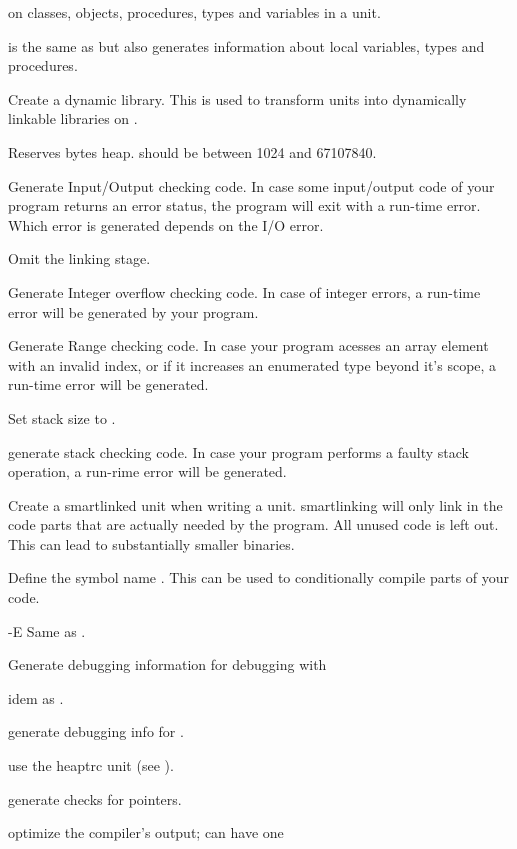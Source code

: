 \documentclass{book}
\begin{document}
\begin{description}
on classes, objects, procedures, types  and variables in a unit.
\item[-bl]  is the same as  but also generates
information about local variables, types and procedures.
\item [-CD] Create a dynamic library. This is used to transform units into
dynamically linkable libraries on \linux.
\item [-Chxxx]  Reserves  bytes heap.  should
be between 1024 and 67107840.
\item [-Ci]  Generate Input/Output checking code. In case some
input/output code of your program returns an error status, the program will
exit with a run-time error. Which error is generated depends on the I/O error.
\item [-Cn]  Omit the linking stage.
\item [-Co]  Generate Integer overflow checking code. In case of
integer errors, a run-time error will be generated by your program.
\item [-Cr]  Generate Range checking code. In case your program
acesses an array element with an invalid index, or if it increases an
enumerated type beyond it's scope, a run-time error will be generated.
\item [-Csxxx]  Set stack size to .
\item [-Ct]  generate stack checking code. In case your program
performs a faulty stack operation, a run-rime error will be generated.
\item [-CX]  Create a smartlinked unit when writing a unit.
smartlinking will only link in the code parts that are actually needed by
the program. All unused code is left out. This can lead to substantially
smaller binaries.
\item [-dxxx]  Define the symbol name . This can be used
to conditionally compile parts of your code.
\item {-E}  Same as .
\item [-g]  Generate debugging information for debugging with
\item [-gg] idem as .
\item [-gd]  generate debugging info for .
\item [-gh] use the heaptrc unit (see \unitsref).
\item [-gc] generate checks for pointers.
\item[-Oxxx]  optimize the compiler's output;  can have one

\end{description}
\end{document}
